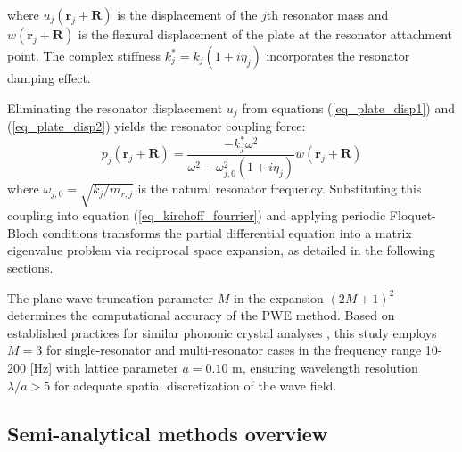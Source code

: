 \documentclass[review,numbers,sort&compress]{elsarticle}
\begin{document}
where \( u_j(\mathbf{r}_j + \mathbf{R}) \) is the displacement of the \( j \)th resonator mass and \( w(\mathbf{r}_j + \mathbf{R}) \) is the flexural displacement of the plate at the resonator attachment point. The complex stiffness \( k_j^* = k_j(1 + i\eta_j) \) incorporates the resonator damping effect.

Eliminating the resonator displacement $u_j$ from equations (\ref{eq_plate_disp1}) and (\ref{eq_plate_disp2}) yields the resonator coupling force:
\begin{equation}
p_j(\mathbf{r}_j + \mathbf{R}) = \frac{-k_j^* \omega^2}{\omega^2 - \omega_{j,0}^2(1 + i\eta_j)} w(\mathbf{r}_j + \mathbf{R})
\label{eq:resonator_coupling}
\end{equation}
where $\omega_{j,0} = \sqrt{k_j/m_{r,j}}$ is the natural resonator frequency. Substituting this coupling into equation (\ref{eq_kirchoff_fourrier}) and applying periodic Floquet-Bloch conditions transforms the partial differential equation into a matrix eigenvalue problem via reciprocal space expansion, as detailed in the following sections.

The plane wave truncation parameter $M$ in the expansion $(2M+1)^2$ determines the computational accuracy of the PWE method. Based on established practices for similar phononic crystal analyses \cite{Phani2006, Laude2009}, this study employs $M = 3$ for single-resonator and multi-resonator cases in the frequency range 10-200 [Hz] with lattice parameter $a = 0.10$ m, ensuring wavelength resolution $\lambda/a > 5$ for adequate spatial discretization of the wave field.

\subsection{Semi-analytical methods overview}\label{methods_overview}
\end{document}

